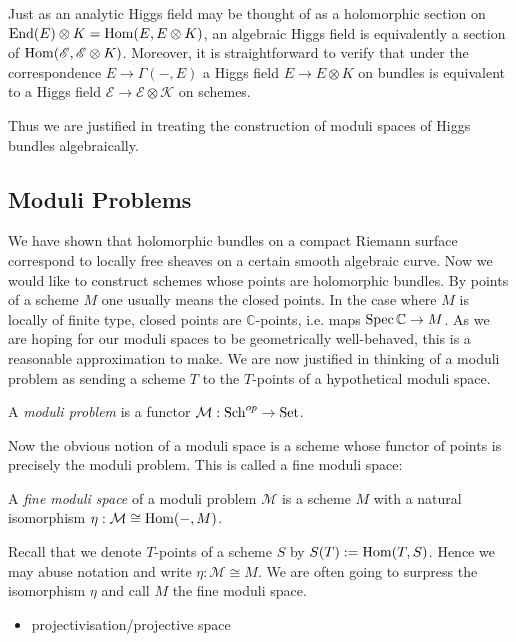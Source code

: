 \documentclass[12pt]{ociamthesis}  %
\begin{document}
Just as an analytic Higgs field may be thought of as a holomorphic
section on $\operatorname{End}(E)\otimes K = \operatorname{Hom}(E,E\otimes K)$, an algebraic
Higgs field is equivalently a section of $\operatorname{Hom}(\mathscr E,\mathscr E\otimes K)$.
Moreover, it is straightforward to verify that under the correspondence
$E\to\Gamma(-,E)$ a Higgs field $E\to E\otimes K$ on bundles is
equivalent to a Higgs field $\mathscr E\to\mathscr E\otimes\mathscr K$
on schemes.

Thus we are justified in treating the construction of moduli
spaces of Higgs bundles algebraically.

\subsection{Moduli Problems}

We have shown that holomorphic bundles on a compact Riemann surface
correspond to locally free sheaves on a certain smooth algebraic
curve. Now we would like to construct schemes whose points are
holomorphic bundles. By points of a scheme $M$ one usually means the
closed points. In the case where $M$ is locally of finite type,
closed points are $\mathbb{C}$-points, i.e. maps
$\operatorname{Spec}\mathbb{C}\to M$. \cite[Corollary 3.36]{gortz2010} As we
are hoping for our moduli spaces to be geometrically well-behaved,
this is a reasonable approximation to make. We are now justified in
thinking of a moduli problem as sending a scheme $T$ to the
$T$-points of a hypothetical moduli space.

\begin{definition}
  A \emph{moduli problem} is a functor $\mathcal M:\operatorname{Sch}^{op}\to\operatorname{Set}$.
\end{definition}

Now the obvious notion of a moduli space is a scheme whose functor
of points is precisely the moduli problem. This is called a fine
moduli space:

\begin{definition}
  A \emph{fine moduli space} of a moduli problem $\mathcal M$
  is a scheme $M$ with a natural isomorphism
  $\eta : \mathcal M \cong \operatorname{Hom}(-,M)$.
\end{definition}

Recall that we denote $T$-points of a scheme $S$ by
$S(T) := \operatorname{Hom}(T,S)$. Hence we may abuse notation and write
$\eta : \mathcal M \cong M$. We are often going to surpress the
isomorphism $\eta$ and call $M$ the fine moduli space.

\begin{example}
  \begin{itemize}
    \item projectivisation/projective space
  \end{itemize}
\end{example}
\end{document}
